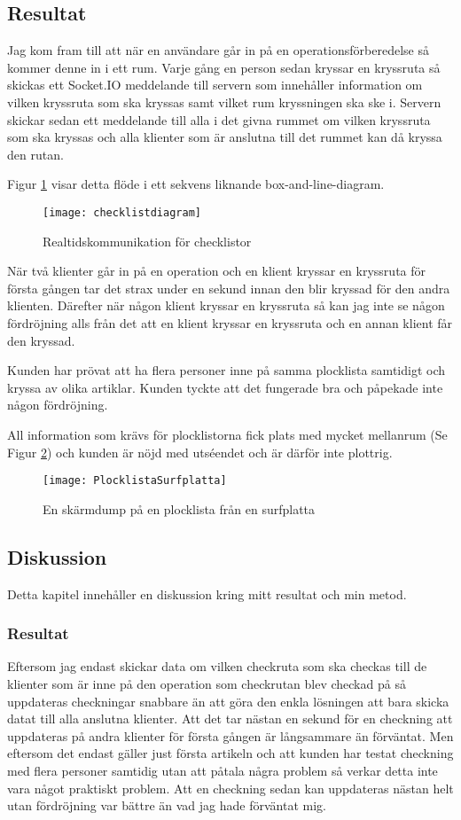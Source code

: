 \subsection{Resultat}
Jag kom fram till att när en användare går in på en operationsförberedelse så kommer denne in i ett rum. Varje gång en person sedan kryssar en kryssruta så skickas ett Socket.IO meddelande till servern som innehåller information om vilken kryssruta som ska kryssas samt vilket rum kryssningen ska ske i. Servern skickar sedan ett meddelande till alla i det givna rummet om vilken kryssruta som ska kryssas och alla klienter som är anslutna till det rummet kan då kryssa den rutan.

Figur \ref{kommunikation} visar detta flöde i ett sekvens liknande box-and-line-diagram.
\begin{figure}
\texttt{[image: checklistdiagram]}
\caption{Realtidskommunikation för checklistor}
\label{kommunikation}
\end{figure}


När två klienter går in på en operation och en klient kryssar en kryssruta för första gången tar det strax under en sekund innan den blir kryssad för den andra klienten. Därefter när någon klient kryssar en kryssruta så kan jag inte se någon fördröjning alls från det att en klient kryssar en kryssruta och en annan klient får den kryssad.

Kunden har prövat att ha flera personer inne på samma plocklista samtidigt och kryssa av olika artiklar. Kunden tyckte att det fungerade bra och påpekade inte någon fördröjning. 

All information som krävs för plocklistorna fick plats med mycket mellanrum (Se Figur \ref{plocklistaSurfplatta}) och kunden är nöjd med utséendet och är därför inte plottrig.

\begin{figure}
\texttt{[image: PlocklistaSurfplatta]}
\caption{En skärmdump på en plocklista från en surfplatta}
\label{plocklistaSurfplatta}
\end{figure}

\pagebreak
\subsection{Diskussion}
Detta kapitel innehåller en diskussion kring mitt resultat och min metod.
\subsubsection{Resultat}
Eftersom jag endast skickar data om vilken checkruta som ska checkas till de klienter som är inne på den operation som checkrutan blev checkad på så uppdateras checkningar snabbare än att göra den enkla lösningen att bara skicka datat till alla anslutna klienter. Att det tar nästan en sekund för en checkning att uppdateras på andra klienter för första gången är långsammare än förväntat. Men eftersom det endast gäller just första artikeln och att kunden har testat checkning med flera personer samtidig utan att påtala några problem så verkar detta inte vara något praktiskt problem. Att en checkning sedan kan uppdateras nästan helt utan fördröjning var bättre än vad jag hade förväntat mig.

